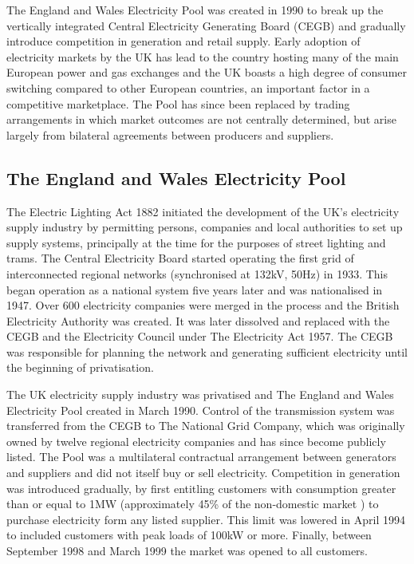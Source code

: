 The England and Wales Electricity Pool was created in 1990 to break up the
vertically integrated Central Electricity Generating Board (CEGB) and
gradually introduce competition in generation and retail supply.  Early
adoption of electricity markets by the UK has lead to the country hosting many
of the main European power and gas exchanges and the UK boasts a high degree
of consumer switching compared to other European countries, an important factor
in a competitive marketplace. The Pool has since been replaced by trading arrangements in which market outcomes
are not centrally determined, but arise largely from bilateral agreements
between producers and suppliers.

\subsection{The England and Wales Electricity Pool}
\label{sec:thepool}
The Electric Lighting Act 1882 initiated the development of the UK's
electricity supply industry by permitting persons, companies and local authorities to set
up supply systems, principally at the time for the purposes of street lighting and
trams.  The Central Electricity Board started operating the first grid of
interconnected regional networks (synchronised at 132kV, 50Hz) in 1933.
This began operation as a national system five years later and was
nationalised in 1947.  Over 600 electricity companies were merged in the
process and the British Electricity Authority was created.  It was later
dissolved and replaced with the CEGB and the Electricity Council under The
Electricity Act 1957.  The CEGB was responsible for planning the network and
generating sufficient electricity until the beginning of privatisation.

The UK electricity supply industry was privatised and The England and Wales
Electricity Pool created in March 1990.  Control of the transmission
system was transferred from the CEGB to The National Grid Company, which was
originally owned by twelve regional electricity companies and has since become publicly listed.  The
Pool was a multilateral contractual arrangement between generators and suppliers and did
not itself buy or sell electricity.  Competition in generation was introduced
gradually, by first entitling customers with consumption greater than or equal
to 1MW (approximately 45\% of the non-domestic market \cite{decc:dukes09}) to
purchase electricity form any listed supplier.  This limit was lowered in April
1994 to included customers with peak loads of 100kW or more.  Finally, between
September 1998 and March 1999 the market was opened to all customers.

